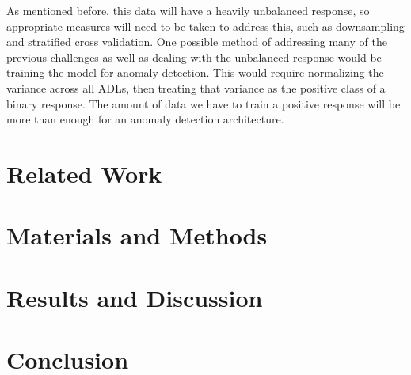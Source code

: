 \documentclass{llncs}
\begin{document}
    As mentioned before, this data will have a heavily unbalanced response, so appropriate measures will need to be taken to address this, such as downsampling and stratified cross validation. One possible method of addressing many of the previous challenges as well as dealing with the unbalanced response would be training the model for anomaly detection. This would require normalizing the variance across all ADLs, then treating that variance as the positive class of a binary response. The amount of data we have to train a positive response will be more than enough for an anomaly detection architecture.
	
	
	
\section{Related Work} %
\section{Materials and Methods}
\section{Results and Discussion}
\section{Conclusion}



%
%
 
 


\end{document}
